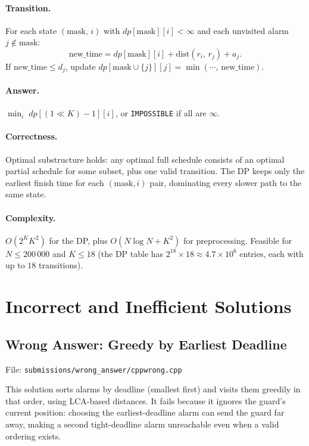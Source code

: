 \documentclass[11pt]{article}
\begin{document}
\paragraph{Transition.}
For each state $(\text{mask},\,i)$ with $dp[\text{mask}][i]<\infty$
and each unvisited alarm $j\notin\text{mask}$:
\[
  \text{new\_time} = dp[\text{mask}][i] + \mathrm{dist}(r_i,\,r_j) + a_j.
\]
If $\text{new\_time}\le d_j$, update
$dp[\text{mask}\cup\{j\}][j] = \min(\cdots,\,\text{new\_time})$.

\paragraph{Answer.}
$\min_i\;dp[(1\ll K)-1][i]$, or \texttt{IMPOSSIBLE} if all are $\infty$.

\paragraph{Correctness.}
Optimal substructure holds: any optimal full schedule consists of an
optimal partial schedule for some subset, plus one valid transition.
The DP keeps only the earliest finish time for each $(\text{mask},i)$ pair,
dominating every slower path to the same state.

\paragraph{Complexity.}
$O(2^K K^2)$ for the DP, plus $O(N\log N + K^2)$ for preprocessing.
Feasible for $N\le 200\,000$ and $K\le 18$ (the DP table has $2^{18}\times 18
\approx 4.7\times 10^6$ entries, each with up to $18$ transitions).

\section*{Incorrect and Inefficient Solutions}

\subsection*{Wrong Answer: Greedy by Earliest Deadline}

File: \texttt{submissions/wrong\_answer/cppwrong.cpp}

This solution sorts alarms by deadline (smallest first) and visits them
greedily in that order, using LCA-based distances.  It fails because it
ignores the guard's current position: choosing the earliest-deadline alarm
can send the guard far away, making a second tight-deadline alarm unreachable
even when a valid ordering exists.
\end{document}
